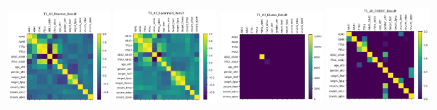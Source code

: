 \begin{figure}
    \centering
    \includegraphics[width=0.24\textwidth]{chap6/figs/T1_All_Pearson_Result.png}
    \includegraphics[width=0.24\textwidth]{chap6/figs/T1_All_Spearman_Result.png}
    \includegraphics[width=0.24\textwidth]{chap6/figs/T1_All_Glasso_Result.png}
    \includegraphics[width=0.24\textwidth]{chap6/figs/T1_All_CODEC_Result.png}
    

\end{figure}
